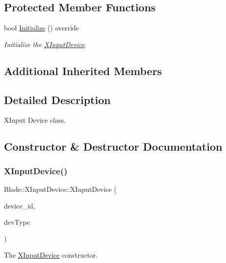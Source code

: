 \subsection*{Protected Member Functions}
\begin{DoxyCompactItemize}
\item 
bool \hyperlink{class_blade_1_1_x_input_device_af446c4579260d23b0af0a7f4bdfda441}{Initialize} () override
\begin{DoxyCompactList}\small\item\em Initialize the \hyperlink{class_blade_1_1_x_input_device}{X\+Input\+Device}. \end{DoxyCompactList}\end{DoxyCompactItemize}
\subsection*{Additional Inherited Members}


\subsection{Detailed Description}
X\+Input Device class. 

\subsection{Constructor \& Destructor Documentation}
\mbox{\label{class_blade_1_1_x_input_device_a6867d41263a24e24767fe7cb02930b0d}} 
\subsubsection{\texorpdfstring{X\+Input\+Device()}{XInputDevice()}}
{\footnotesize\ttfamily Blade\+::\+X\+Input\+Device\+::\+X\+Input\+Device (\begin{DoxyParamCaption}\item[{int}]{device\+\_\+id,  }\item[{Device\+Type}]{dev\+Type }\end{DoxyParamCaption})}



The \hyperlink{class_blade_1_1_x_input_device}{X\+Input\+Device} constructor. 



